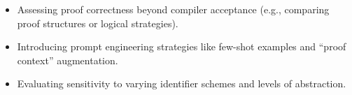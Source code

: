 \begin{itemize}
  \item Assessing proof correctness beyond compiler acceptance (e.g., comparing proof structures or logical strategies).
  \item Introducing prompt engineering strategies like few-shot examples and ``proof context'' augmentation.
  \item Evaluating sensitivity to varying identifier schemes and levels of abstraction.
\end{itemize}
